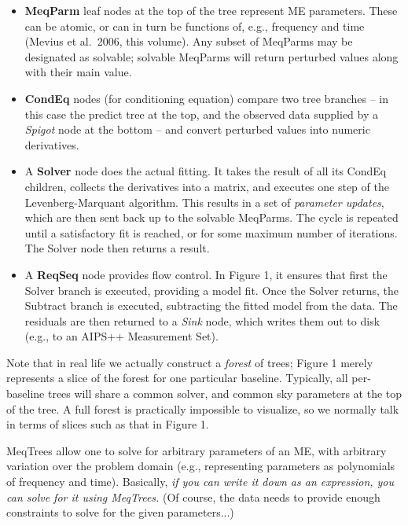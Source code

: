 \documentclass[11pt,twoside]{article}  %
\begin{document}
\begin{itemize}

\item {\bf MeqParm} leaf nodes at the top of the tree represent ME parameters.
These can be atomic, or can in turn be functions of, e.g., frequency and time
(Mevius et al.\  2006, this volume). Any subset of MeqParms may be designated as
solvable; solvable MeqParms will return perturbed values along with their main
value.

\item {\bf CondEq} nodes (for conditioning equation) compare two tree branches
-- in this case the predict tree at the top, and the observed data supplied by a
{\em Spigot} node at the bottom -- and convert perturbed values into numeric
derivatives.

\item A {\bf Solver} node does the actual fitting. It takes the result of all
its CondEq children, collects the derivatives into a matrix, and executes one
step of the Levenberg-Marquant algorithm. This results in a set of {\em
parameter updates}, which are then sent back up to the solvable MeqParms. The
cycle is repeated until a satisfactory fit is reached, or for some maximum
number of iterations. The Solver node then returns a result.

\item A {\bf ReqSeq} node provides flow control. In Figure 1, it ensures that
first the Solver branch is executed, providing a model fit. Once the Solver
returns, the Subtract branch is executed, subtracting the fitted model from the
data. The residuals are then returned to a {\em Sink} node, which writes them
out to disk (e.g., to an AIPS++ Measurement Set).

\end{itemize}

Note that in real life we actually construct a {\em forest} of trees; Figure 1
merely represents a slice of the forest for one particular baseline. Typically,
all per-baseline trees will share a common solver, and common sky parameters at
the top of the tree. A full forest is practically impossible to visualize, so we
normally talk in terms of slices such as that in Figure 1.

MeqTrees allow one to solve for arbitrary parameters of an ME, with arbitrary
variation over the problem domain (e.g., representing parameters as polynomials
of frequency and time). Basically, {\em if you can write it down as an
expression, you can solve for it using MeqTrees.} (Of course, the data needs to
provide enough constraints to solve for the given parameters...)
\end{document}
